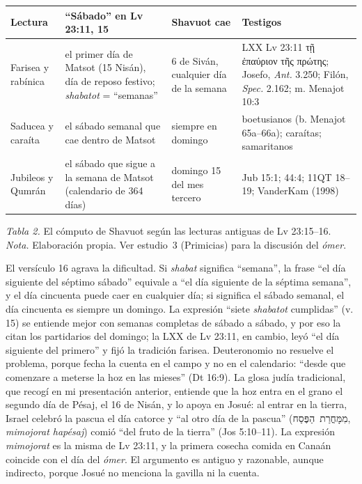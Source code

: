 \documentclass[11pt,letterpaper]{article}
\newcommand{\heb}[1]{\mbox{\foreignlanguage{hebrew}{#1}}}
\newcommand{\grc}[1]{\foreignlanguage{ancientgreek}{#1}}
\begin{document}
\begin{center}\small\renewcommand{\arraystretch}{1.22}
\begin{tabular}{@{}L{3.1cm}L{4.3cm}L{3.4cm}L{4.4cm}@{}}
\toprule
\textbf{Lectura} & \textbf{``Sábado'' en Lv 23:11, 15} & \textbf{Shavuot cae} & \textbf{Testigos} \\ \midrule
Farisea y rabínica & el primer día de Matsot (15 Nisán), día de reposo festivo; \emph{shabatot} = ``semanas'' & 6 de Siván, cualquier día de la semana & LXX Lv 23:11 \grc{τῇ ἐπαύριον τῆς πρώτης}; Josefo, \emph{Ant.} 3.250; Filón, \emph{Spec.} 2.162; m. Menajot 10:3 \\
Saducea y caraíta & el sábado semanal que cae dentro de Matsot & siempre en domingo & boetusianos (b. Menajot 65a--66a); caraítas; samaritanos \\
Jubileos y Qumrán & el sábado que sigue a la semana de Matsot (calendario de 364 días) & domingo 15 del mes tercero & Jub 15:1; 44:4; 11QT 18--19; VanderKam (1998) \\
\bottomrule
\end{tabular}\par
{\footnotesize\color{sepia}\textit{Tabla 2.} El cómputo de Shavuot según las lecturas antiguas de Lv 23:15--16. \textit{Nota.} Elaboración propia. Ver estudio~3 (Primicias) para la discusión del \emph{ómer}.}
\end{center}

El versículo 16 agrava la dificultad. Si \emph{shabat} significa ``semana'', la frase ``el día siguiente del séptimo sábado'' equivale a ``el día siguiente de la séptima semana'', y el día cincuenta puede caer en cualquier día; si significa el sábado semanal, el día cincuenta es siempre un domingo. La expresión ``siete \emph{shabatot} cumplidas'' (v. 15) se entiende mejor con semanas completas de sábado a sábado, y por eso la citan los partidarios del domingo; la LXX de Lv 23:11, en cambio, leyó ``el día siguiente del primero'' y fijó la tradición farisea. Deuteronomio no resuelve el problema, porque fecha la cuenta en el campo y no en el calendario: ``desde que comenzare a meterse la hoz en las mieses'' (Dt 16:9). La glosa judía tradicional, que recogí en mi presentación anterior, entiende que la hoz entra en el grano el segundo día de Pésaj, el 16 de Nisán, y lo apoya en Josué: al entrar en la tierra, Israel celebró la pascua el día catorce y ``al otro día de la pascua'' (\heb{מִמָּחֳרַת הַפֶּסַח}, \emph{mimojorat hapésaj}) comió ``del fruto de la tierra'' (Jos 5:10--11). La expresión \emph{mimojorat} es la misma de Lv 23:11, y la primera cosecha comida en Canaán coincide con el día del \emph{ómer}. El argumento es antiguo y razonable, aunque indirecto, porque Josué no menciona la gavilla ni la cuenta.
\end{document}
